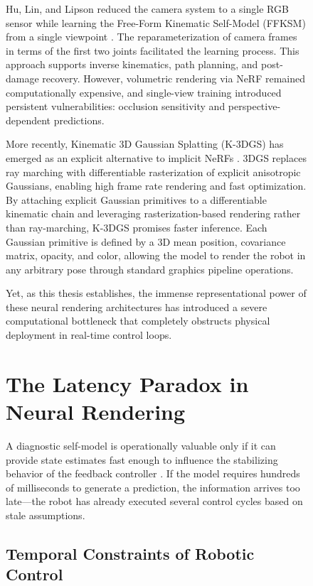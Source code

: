 \documentclass[12pt,a4paper,oneside]{report}
\begin{document}
\begin{figure}[H]
Hu, Lin, and Lipson reduced the camera system to a single RGB sensor while learning the Free-Form Kinematic Self-Model (FFKSM) from a single viewpoint \cite{hu2024teaching}. The reparameterization of camera frames in terms of the first two joints facilitated the learning process. This approach supports inverse kinematics, path planning, and post-damage recovery. However, volumetric rendering via NeRF remained computationally expensive, and single-view training introduced persistent vulnerabilities: occlusion sensitivity and perspective-dependent predictions.

More recently, Kinematic 3D Gaussian Splatting (K-3DGS) has emerged as an explicit alternative to implicit NeRFs \cite{hu2025learning}. 3DGS replaces ray marching with differentiable rasterization of explicit anisotropic Gaussians, enabling high frame rate rendering and fast optimization. By attaching explicit Gaussian primitives to a differentiable kinematic chain and leveraging rasterization-based rendering rather than ray-marching, K-3DGS promises faster inference. Each Gaussian primitive is defined by a 3D mean position, covariance matrix, opacity, and color, allowing the model to render the robot in any arbitrary pose through standard graphics pipeline operations.

Yet, as this thesis establishes, the immense representational power of these neural rendering architectures has introduced a severe computational bottleneck that completely obstructs physical deployment in real-time control loops.

\section{The Latency Paradox in Neural Rendering}
\label{sec:latency_paradox}

A diagnostic self-model is operationally valuable only if it can provide state estimates fast enough to influence the stabilizing behavior of the feedback controller \cite{hu2024teaching, hu2025learning}. If the model requires hundreds of milliseconds to generate a prediction, the information arrives too late---the robot has already executed several control cycles based on stale assumptions.

\subsection{Temporal Constraints of Robotic Control}
\label{subsec:temporal_constraints}


\end{figure}
\end{document}
